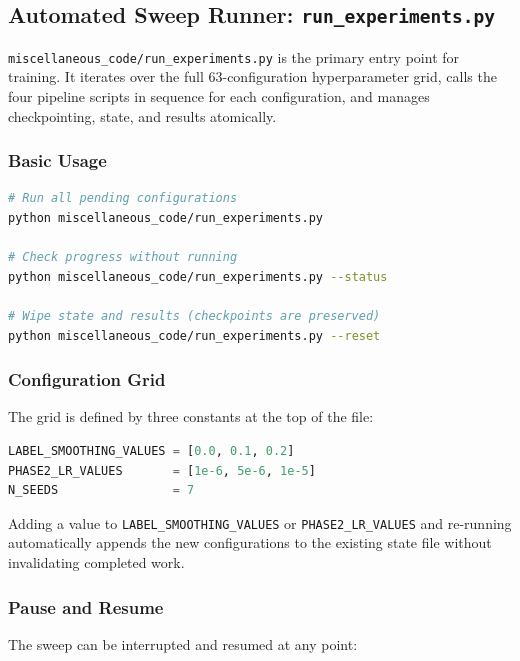 \documentclass[12pt,a4paper]{article}
\begin{document}
\subsection{Automated Sweep Runner: \texttt{run\_experiments.py}}
\label{sec:pg-sweep}

\texttt{miscellaneous\_code/run\_experiments.py} is the primary entry point for
training. It iterates over the full 63-configuration hyperparameter grid, calls
the four pipeline scripts in sequence for each configuration, and manages
checkpointing, state, and results atomically.

\subsubsection{Basic Usage}

\begin{lstlisting}[language=bash]
# Run all pending configurations
python miscellaneous_code/run_experiments.py

# Check progress without running
python miscellaneous_code/run_experiments.py --status

# Wipe state and results (checkpoints are preserved)
python miscellaneous_code/run_experiments.py --reset
\end{lstlisting}

\subsubsection{Configuration Grid}

The grid is defined by three constants at the top of the file:

\begin{lstlisting}[language=Python]
LABEL_SMOOTHING_VALUES = [0.0, 0.1, 0.2]
PHASE2_LR_VALUES       = [1e-6, 5e-6, 1e-5]
N_SEEDS                = 7
\end{lstlisting}

Adding a value to \texttt{LABEL\_SMOOTHING\_VALUES} or \texttt{PHASE2\_LR\_VALUES}
and re-running automatically appends the new configurations to the existing
state file without invalidating completed work.

\subsubsection{Pause and Resume}

The sweep can be interrupted and resumed at any point:
\end{document}
